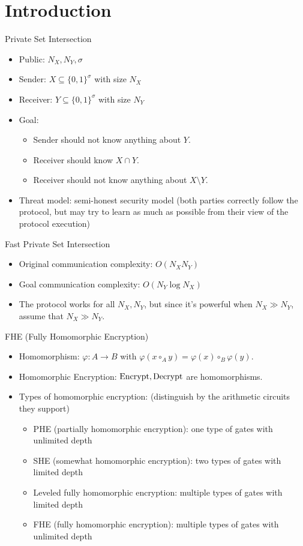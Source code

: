 \section{Introduction}

\begin{frame}{Private Set Intersection}
\begin{itemize}
\item Public: $N_X, N_Y, \sigma$
\item Sender: $X\subseteq\{0, 1\}^\sigma$ with size $N_X$
\item Receiver: $Y\subseteq\{0, 1\}^\sigma$ with size $N_Y$
\item Goal:
\begin{itemize}
\item Sender should not know anything about $Y$.
\item Receiver should know $X\cap Y$.
\item Receiver should not know anything about $X\setminus Y$.
\end{itemize}
\item Threat model: semi-honest security model (both parties correctly follow the protocol, but may try to learn as much as possible from their view of the protocol execution)
\end{itemize}
\end{frame}

\begin{frame}{Fast Private Set Intersection}
\begin{itemize}
\item Original communication complexity: $O(N_XN_Y)$
\item Goal communication complexity: $O(N_Y\log N_X)$
\item The protocol works for all $N_X, N_Y$, but since it's powerful when $N_X\gg N_Y$, assume that $N_X\gg N_Y$.
\end{itemize}
\end{frame}

\begin{frame}{FHE (Fully Homomorphic Encryption)}
\begin{itemize}
\item Homomorphism: $\varphi: A\to B$ with $\varphi(x\circ_Ay)=\varphi(x)\circ_B\varphi(y)$.
\item Homomorphic Encryption: $\mathrm{Encrypt}, \mathrm{Decrypt}$ are homomorphisms.
\item Types of homomorphic encryption: (distinguish by the arithmetic circuits they support)
\begin{itemize}
\item PHE (partially homomorphic encryption): one type of gates with unlimited depth
\item SHE (somewhat homomorphic encryption): two types of gates with limited depth
\item Leveled fully homomorphic encryption: multiple types of gates with limited depth
\item FHE (fully homomorphic encryption): multiple types of gates with unlimited depth
\end{itemize}
\end{itemize}
\end{frame}

